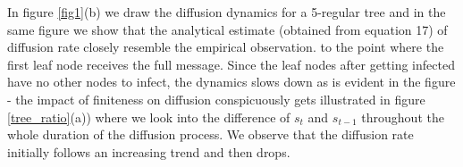 
{In figure \ref{fig1}(b) we draw the diffusion dynamics for a 5-regular tree and in the same figure we show that the
analytical estimate (obtained from equation 17) of diffusion rate closely resemble the empirical
observation. 
to the point where the first leaf node receives the full message. 
Since the leaf nodes after getting infected have no other nodes to infect,  the dynamics
slows down as is evident in the  figure  - the impact of finiteness on 
diffusion conspicuously gets illustrated in figure \ref{tree_ratio}(a)) where we look into the difference of $s_t$ and $s_{t-1}$ throughout the 
whole duration of the diffusion process. We observe that the diffusion rate initially follows an increasing trend and then drops.
\fi

}
